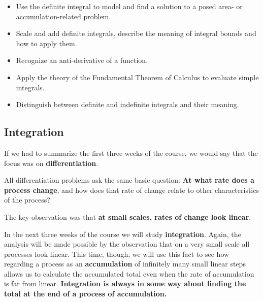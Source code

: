 



\setfont
\pagestyle{fancy}
\renewcommand{\Week}{4 }
\renewcommand{\WeekTitle}{\WeekTitleFour }

\fancyhead[LE,RO]{Week \Week}  %
\fancyfoot{}
\sectionbox{Week \#\Week: \WeekTitle}


\vspace{5mm}
\goals
\begin{itemize}
\item Use the definite integral to model and find a solution to a
  posed area- or accumulation-related problem.
\item Scale and add definite integrals, describe the meaning of
  integral bounds and how to apply them.
\item Recognize an anti-derivative of a function.
\item Apply the theory of the Fundamental Theorem of Calculus to
  evaluate simple integrals.
\item Distinguish between definite and indefinite integrals and their
  meaning.
\end{itemize}

\vspace{5mm}




\subsection*{Integration} 
If we had to summarize the first three weeks of the course, we would
say that the focus was on {\bf differentiation}.

All differentiation problems ask the same basic question: {\bf At what
  rate does a process change}, and how does that rate of change relate
to other characteristics of the process?

The key observation was that {\bf at small scales, rates of change look linear}.

\newpage

In the next three weeks of the course we will study {\bf integration}.
Again, the analysis will be made possible by the observation that on a
very small scale all processes look linear.  This time, though, we
will use this fact to see how regarding a process as an {\bf
  accumulation} of infinitely many small linear steps allows us to
calculate the accumulated total even when the rate of accumulation is
far from linear.  {\bf Integration is always in some way about finding
  the total at the end of a process of accumulation.}


